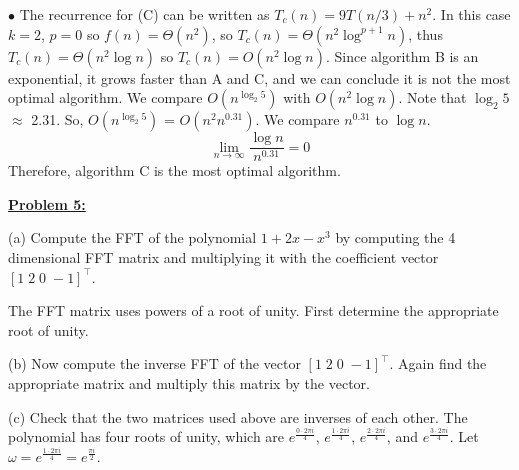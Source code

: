 \documentclass[11pt]{article}
\begin{document}
\begin{flushleft}
		$\bullet$ The recurrence for (C) can be written as $T_c(n) = 9T(n/3) + n^2$. In this case $k = 2$, $p = 0$ so $f(n) = \Theta(n^2)$, so $T_c(n) = \Theta(n^2 \log^{p + 1} n)$, thus $T_c(n) = \Theta(n^2 \log n)$ so $T_c(n) = O(n^2 \log n)$. 
		\newline
		\newline
		Since algorithm B is an exponential, it grows faster than A and C, and we can conclude it is not the most optimal algorithm. We compare $O(n^{\log_2 5})$ with $O(n^2 \log n)$. Note that $\log_2 5$ $\approx$ 2.31. So, $O(n^{\log_2 5})$ = $O(n^2n^{0.31})$. We compare $n^{0.31}$ to $\log n$. $$\lim_{n\to\infty} \frac{\log n}{n^{0.31}} = 0$$ Therefore, algorithm C is the most optimal algorithm. 
		
		\item \textbf {\underline{Problem 5:}}

		\item
		(a) Compute the FFT of the polynomial $1+2x-x^3$ by computing
		the 4 dimensional FFT matrix and multiplying it with the
		coefficient vector $[1\; 2\; 0\; -\!1]^\top$.
		
		The FFT matrix uses powers of a root of unity.
		First determine the appropriate root of unity.
		\item
		(b) Now compute the inverse FFT of the vector $[1\; 2\; 0\; -\!1]^\top$.
		Again find the appropriate matrix and multiply this matrix
		by the vector.
		\item
		(c) Check that the two matrices used above are inverses of each
		other.
		\newline\newline
		The polynomial has four roots of unity, which are $e^{\frac{0 \cdot 2\pi i}{4}}$, $e^{\frac{1 \cdot 2\pi i}{4}}$, $e^{\frac{2 \cdot 2\pi i}{4}}$, and $e^{\frac{3 \cdot 2\pi i}{4}}$. Let $\omega = e^{\frac{1 \cdot 2\pi i}{4}} = e^{\frac{\pi i}{2}}$. 
		

\end{flushleft}
\end{document}
